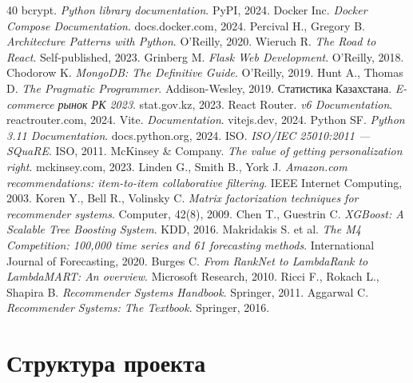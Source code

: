 \documentclass[14pt,a4paper]{extreport}
\begin{document}
\begin{thebibliography}{40}
 bcrypt. \textit{Python library documentation}. PyPI, 2024.
 Docker Inc. \textit{Docker Compose Documentation}. docs.docker.com, 2024.
 Percival H., Gregory B. \textit{Architecture Patterns with Python}. O'Reilly, 2020.
 Wieruch R. \textit{The Road to React}. Self-published, 2023.
 Grinberg M. \textit{Flask Web Development}. O'Reilly, 2018.
 Chodorow K. \textit{MongoDB: The Definitive Guide}. O'Reilly, 2019.
 Hunt A., Thomas D. \textit{The Pragmatic Programmer}. Addison-Wesley, 2019.
 Статистика Казахстана. \textit{E-commerce рынок РК 2023}. stat.gov.kz, 2023.
 React Router. \textit{v6 Documentation}. reactrouter.com, 2024.
 Vite. \textit{Documentation}. vitejs.dev, 2024.
 Python SF. \textit{Python 3.11 Documentation}. docs.python.org, 2024.
 ISO. \textit{ISO/IEC 25010:2011 --- SQuaRE}. ISO, 2011.
 McKinsey \& Company. \textit{The value of getting personalization right}. mckinsey.com, 2023.
 Linden G., Smith B., York J. \textit{Amazon.com recommendations: item-to-item collaborative filtering}. IEEE Internet Computing, 2003.
 Koren Y., Bell R., Volinsky C. \textit{Matrix factorization techniques for recommender systems}. Computer, 42(8), 2009.
 Chen T., Guestrin C. \textit{XGBoost: A Scalable Tree Boosting System}. KDD, 2016.
 Makridakis S. et al. \textit{The M4 Competition: 100,000 time series and 61 forecasting methods}. International Journal of Forecasting, 2020.
 Burges C. \textit{From RankNet to LambdaRank to LambdaMART: An overview}. Microsoft Research, 2010.
 Ricci F., Rokach L., Shapira B. \textit{Recommender Systems Handbook}. Springer, 2011.
 Aggarwal C. \textit{Recommender Systems: The Textbook}. Springer, 2016.

\end{thebibliography}

\appendix

\chapter{Структура проекта}
\end{document}
